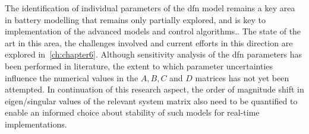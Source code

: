  The
identification of  individual parameters  of the \gls{dfn}  model remains  a key
area in  battery modelling that remains  only partially explored, and  is key to
implementation of the advanced models and control algorithms.. The  state  of the  art  in this  area,
the  challenges involved  and current  efforts  in this  direction are  explored
in~\cref{ch:chapter6}. Although sensitivity analysis of the \gls{dfn} parameters
has  been performed  in literature,   the  extent to  which
parameter uncertainties influence the numerical values  in the $A, B, C$ and $D$
matrices has  not yet been attempted.  In continuation of this  research aspect,
the order  of magnitude shift  in eigen/singular  values of the  relevant system
matrix also need  to be quantified to enable an  informed choice about stability
of such models for real-time implementations.










